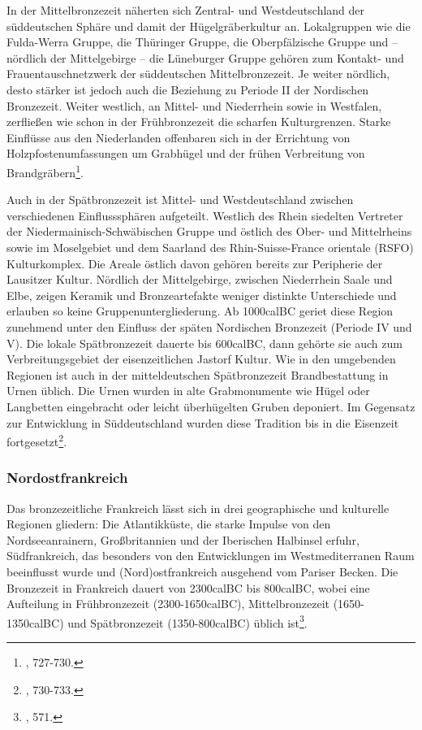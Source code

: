 \documentclass[openany,twoside,twocolumn]{book}
\let\rmarkdownfootnote\footnote%
\def\footnote{\protect\rmarkdownfootnote}
\begin{document}
In der Mittelbronzezeit näherten sich Zentral- und Westdeutschland der
süddeutschen Sphäre und damit der Hügelgräberkultur an. Lokalgruppen wie
die Fulda-Werra Gruppe, die Thüringer Gruppe, die Oberpfälzische Gruppe
und -- nördlich der Mittelgebirge -- die Lüneburger Gruppe gehören zum
Kontakt- und Frauentauschnetzwerk der süddeutschen Mittelbronzezeit. Je
weiter nördlich, desto stärker ist jedoch auch die Beziehung zu Periode
II der Nordischen Bronzezeit. Weiter westlich, an Mittel- und
Niederrhein sowie in Westfalen, zerfließen wie schon in der
Frühbronzezeit die scharfen Kulturgrenzen. Starke Einflüsse aus den
Niederlanden offenbaren sich in der Errichtung von
Holzpfostenumfassungen um Grabhügel und der frühen Verbreitung von
Brandgräbern\footnote{\textcite{jockenhovel_germany_2013}, 727-730.}.

Auch in der Spätbronzezeit ist Mittel- und Westdeutschland zwischen
verschiedenen Einflusssphären aufgeteilt. Westlich des Rhein siedelten
Vertreter der Niedermainisch-Schwäbischen Gruppe und östlich des Ober-
und Mittelrheins sowie im Moselgebiet und dem Saarland des
Rhin-Suisse-France orientale (RSFO) Kulturkomplex. Die Areale östlich
davon gehören bereits zur Peripherie der Lausitzer Kultur. Nördlich der
Mittelgebirge, zwischen Niederrhein Saale und Elbe, zeigen Keramik und
Bronzeartefakte weniger distinkte Unterschiede und erlauben so keine
Gruppenuntergliederung. Ab 1000calBC geriet diese Region zunehmend unter
den Einfluss der späten Nordischen Bronzezeit (Periode IV und V). Die
lokale Spätbronzezeit dauerte bis 600calBC, dann gehörte sie auch zum
Verbreitungsgebiet der eisenzeitlichen Jastorf Kultur. Wie in den
umgebenden Regionen ist auch in der mitteldeutschen Spätbronzezeit
Brandbestattung in Urnen üblich. Die Urnen wurden in alte Grabmonumente
wie Hügel oder Langbetten eingebracht oder leicht überhügelten Gruben
deponiert. Im Gegensatz zur Entwicklung in Süddeutschland wurden diese
Tradition bis in die Eisenzeit fortgesetzt\footnote{\textcite{jockenhovel_germany_2013},
  730-733.}.

\hypertarget{nordostfrankreich}{%
\subsubsection{Nordostfrankreich}\label{nordostfrankreich}}

Das bronzezeitliche Frankreich lässt sich in drei geographische und
kulturelle Regionen gliedern: Die Atlantikküste, die starke Impulse von
den Nordseeanrainern, Großbritannien und der Iberischen Halbinsel
erfuhr, Südfrankreich, das besonders von den Entwicklungen im
Westmediterranen Raum beeinflusst wurde und (Nord)ostfrankreich
ausgehend vom Pariser Becken. Die Bronzezeit in Frankreich dauert von
2300calBC bis 800calBC, wobei eine Aufteilung in Frühbronzezeit
(2300-1650calBC), Mittelbronzezeit (1650-1350calBC) und Spätbronzezeit
(1350-800calBC) üblich ist\footnote{\textcite{mordant_bronze_2013}, 571.}.
\end{document}

